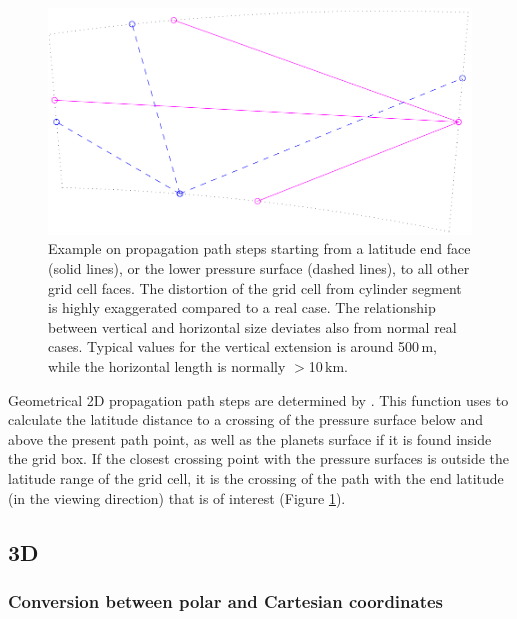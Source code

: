 \begin{figure}
 \begin{center}
  \includegraphics*[width=0.80\hsize]{ppath_ex3}
  \caption{Example on propagation path steps starting from a latitude end face 
    (solid lines), or the lower pressure surface (dashed lines), to
    all other grid cell faces. The distortion of the grid cell from
    cylinder segment is highly exaggerated compared to a real case.
    The relationship between vertical and horizontal size deviates
    also from normal real cases.  Typical values for the vertical
    extension is around 500\,m, while the horizontal length is
    normally $>$10\,km.}
  \label{fig:ppath:ex3}  
 \end{center}
\end{figure}

Geometrical 2D propagation path steps are determined by
. This function uses
 to calculate the latitude distance to a
crossing of the pressure surface below and above the present path point, as
well as the planets surface if it is found inside the grid box. If the closest
crossing point with the pressure surfaces is outside the latitude range of the
grid cell, it is the crossing of the path with the end latitude (in the viewing
direction) that is of interest (Figure \ref{fig:ppath:ex3}).



\subsection{3D}
\label{sec:ppath:3Dgeom}
\subsubsection{Conversion between polar and Cartesian coordinates}
\label{sec:ppath:cart2sph}

